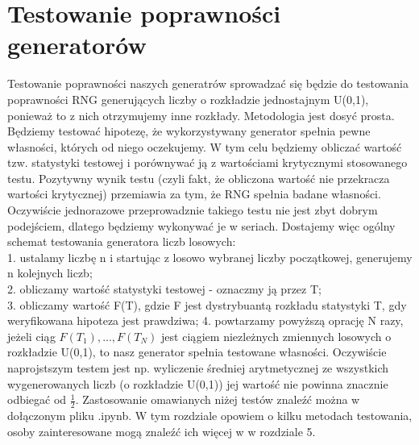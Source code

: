 \documentclass[a4paper]{scrartcl}
\begin{document}
\section{Testowanie poprawności generatorów}
\qquad Testowanie poprawności naszych generatrów sprowadzać się będzie do testowania poprawności RNG generujących liczby o rozkładzie jednostajnym U(0,1), ponieważ to z nich otrzymujemy inne rozkłady. Metodologia jest dosyć prosta. Będziemy testować hipotezę, że wykorzystywany generator spełnia pewne własności, których od niego oczekujemy. W tym celu będziemy obliczać wartość tzw. statystyki testowej i porównywać ją z wartościami krytycznymi stosowanego testu. Pozytywny wynik testu (czyli fakt, że obliczona wartość nie przekracza wartości krytycznej) przemiawia za tym, że RNG spełnia badane własności. Oczywiście jednorazowe przeprowadznie takiego testu nie jest zbyt dobrym podejściem, dlatego będziemy wykonywać je w seriach. Dostajemy więc ogólny schemat testowania generatora liczb losowych:\\
1. ustalamy liczbę n i startując z losowo wybranej liczby początkowej, generujemy n kolejnych liczb;\\
2. obliczamy wartość statystyki testowej - oznaczmy ją przez T;\\
3. obliczamy wartość F(T), gdzie F jest dystrybuantą rozkładu statystyki T, gdy weryfikowana hipoteza jest prawdziwa;
4. powtarzamy powyższą oprację N razy, jeżeli ciąg $F(T_1),...,F(T_N)$ jest ciągiem niezleżnych zmiennych losowych o rozkładzie U(0,1), to nasz generator spełnia testowane własności. Oczywiście naprojstszym testem jest np. wyliczenie średniej arytmetycznej ze wszystkich wygenerowanych liczb (o rozkładzie U(0,1)) jej wartość nie powinna znacznie odbiegać od $\frac{1}{2}$. Zastosowanie omawianych niżej testów znaleźć można w dołączonym pliku .ipynb. W tym rozdziale opowiem o kilku metodach testowania, osoby zainteresowane mogą znaleźć ich więcej w \cite{RNGZiel2} w rozdziale 5.
\end{document}
